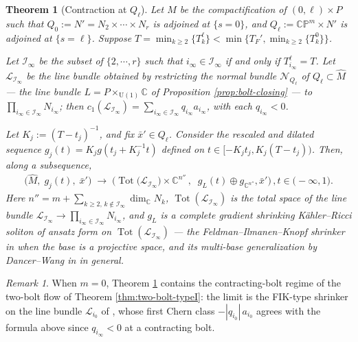 \documentclass[11pt]{amsart}
\theoremstyle{plain}
\numberwithin{equation}{section}
\newtheorem{theorem}{Theorem}[section]
\theoremstyle{definition}
\theoremstyle{remark}
\newtheorem*{remarkx}{Remark}
\begin{document}
\begin{theorem}[Contraction at $Q_\ell$]
\label{thm:contracting_Ql}
Let $\widehat{M}$ be the compactification of $(0,\ell) \times P$ such that $Q_0 := N' = N_2 \times \cdots \times N_r$ is adjoined at $\{s = 0\}$, and $Q_\ell := \mathbb{CP}^m \times N'$ is adjoined at $\{s = \ell\}$. Suppose
$T = \min_{k \geq 2}\{T_k^\ell\} < \min\big\{T_F', \min_{k\geq 2}\{T_k^0\}\big\}$.

Let $\mathcal{I}_\infty$ be the subset of $\{2, \cdots, r\}$ such that $i_\infty \in \mathcal{I}_\infty$ if and only if $T_{i_\infty}^\ell = T$. Let $\mathcal{L}_{\mathcal{I}_\infty}$ be the line bundle obtained by restricting the normal bundle $\mathcal{N}_{Q_\ell}$ of $Q_\ell \subset \widehat{M}$ --- the line bundle $L = P \times_{\mathrm{U}(1)} \mathbb{C}$ of Proposition \ref{prop:bolt-closing} --- to $\prod_{i_\infty \in \mathcal{I}_\infty} N_{i_\infty}$; then $c_1 ( \mathcal{L}_{\mathcal{I}_\infty} ) = \sum_{i_\infty \in \mathcal{I}_\infty} q_{i_\infty} a_{i_\infty}$, with each $q_{i_\infty} < 0$.

Let $K_j := (T-t_j)^{-1}$, and fix $\bar{x}' \in Q_\ell$. Consider the rescaled and dilated sequence $g_j(t) = K_j g(t_j + K_j^{-1}t)$ defined on $t \in [-K_j t_j, K_j(T-t_j))$. Then, along a subsequence,
\begin{equation}\label{eq:limit_Ql}
\begin{gathered}
\big( \widehat{M}, \; g_j (t), \; \bar{x}' \big) \;\longrightarrow\; \Big( \operatorname{Tot} \big( \mathcal{L}_{\mathcal{I}_\infty} \big) \times \mathbb{C}^{n''} \,, \;\; g_L (t) \oplus g_{\mathbb{C}^{n''}}, \bar{x}'\Big) \,, t \in \big( - \infty, 1 \big).
\end{gathered}
\end{equation}
Here $n'' = m + \sum_{k \geq 2, \, k \not\in \mathcal{I}_\infty} \dim_{\mathbb{C}} N_{k}$, $\operatorname{Tot} ( \mathcal{L}_{\mathcal{I}_\infty} )$ is the total space of the line bundle $\mathcal{L}_{\mathcal{I}_\infty} \to \prod_{i_\infty \in \mathcal{I}_\infty} N_{i_\infty}$, and $g_L$ is a complete gradient shrinking K\"ahler--Ricci soliton of ansatz form on $\operatorname{Tot} ( \mathcal{L}_{\mathcal{I}_\infty} )$ --- the Feldman--Ilmanen--Knopf shrinker in \cite{FIK} when the base is a projective space, and its multi-base generalization by Dancer--Wang in \cite{DW2011} in general.
\end{theorem}

\begin{remarkx}
When $m = 0$, Theorem \ref{thm:contracting_Ql} contains the contracting-bolt regime of the two-bolt flow of Theorem \ref{thm:two-bolt-typeI}: the limit is the FIK-type shrinker on the line bundle $\mathcal{L}_{i_0}$ of \cite{FT}, whose first Chern class $-|q_{i_0}|\,a_{i_0}$ agrees with the formula above since $q_{i_\infty} < 0$ at a contracting bolt.
\end{remarkx}
\end{document}
